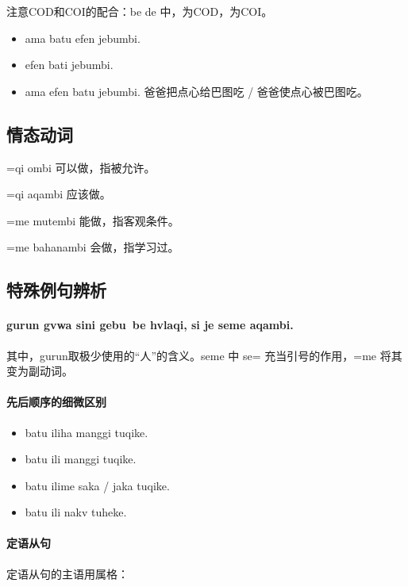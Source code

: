 注意COD和COI的配合：\A \B be \C de 中，\B 为COD，\C 为COI。

\begin{itemize}
    \item ama batu  efen jebumbi.
    \item efen bati  jebumbi.
    \item ama efen  batu  jebumbi. 爸爸把点心给巴图吃 / 爸爸使点心被巴图吃。
\end{itemize}

\subsection{情态动词}

\begin{des}
    \item[\V=qi ombi] 可以做\V ，指被允许。
    \item[\V=qi aqambi] 应该做\V 。
    \item[\V=me mutembi] 能做\V ，指客观条件。
    \item[\V=me bahanambi] 会做\V ，指学习过。
\end{des}

\subsection{特殊例句辨析}

\paragraph{gurun gvwa sini gebu~be hvlaqi, si je seme  aqambi.} 其中，gurun取极少使用的“人”的含义。seme 中 se= 充当引号的作用，=me 将其变为副动词。

\paragraph{先后顺序的细微区别}

\begin{itemize}
    \item batu iliha manggi tuqike.
    \item batu ili manggi tuqike.
    \item batu ilime saka / jaka tuqike.
    \item batu ili nakv tuheke.
\end{itemize}

\paragraph{定语从句} 定语从句的主语用属格：

